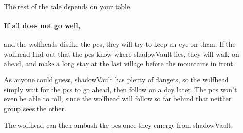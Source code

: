 The rest of the tale depends on your table.

\paragraph{If all does not go well,}
and the \glspl{wolfhead} dislike the \glspl{pc}, they will try to keep an eye on them.
If the \gls{wolfhead} find out that the \glspl{pc} know where \gls{shadowVault} lies, they will walk on ahead, and make a long stay at the last \gls{village} before the mountains in front.

As anyone could guess, \gls{shadowVault} has plenty of dangers, so the \gls{wolfhead} simply wait for the \glspl{pc} to go ahead, then follow on a day later.
The \glspl{pc} won't even be able to roll, since the \gls{wolfhead} will follow so far behind that neither group sees the other.

The \gls{wolfhead} can then ambush the \glspl{pc} once they emerge from \gls{shadowVault}.

